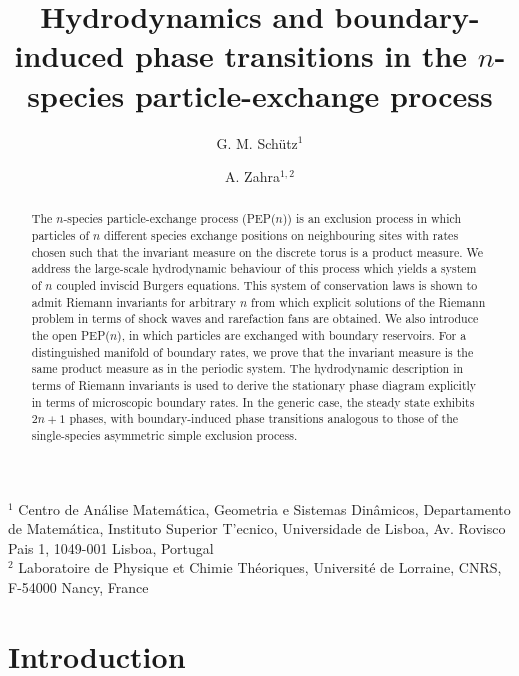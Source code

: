 \documentclass[12pt]{article}
\begin{document}
\title{Hydrodynamics and boundary-induced phase transitions in the $n$-species
particle-exchange process}

   

\author{G. M. Sch\"utz$^{1}$ \and A. Zahra$^{1,2}$}
\vspace{10pt}

\maketitle

\noindent $^{1}$ Centro de An\'alise Matem\'atica, Geometria e Sistemas Din\^amicos, Departamento de Matem\'atica, Instituto Superior T'ecnico, Universidade de Lisboa, Av. Rovisco Pais 1, 1049-001 Lisboa, Portugal\\
$^{2}$ Laboratoire de Physique et Chimie Th\'eoriques, Universit\'e de Lorraine, CNRS, F-54000 Nancy, France\\




\begin{abstract}
The $n$-species particle-exchange process (PEP($n$)) is an exclusion process in which particles of $n$ different species exchange positions on neighbouring sites with rates chosen such that the invariant measure on the discrete torus is a product measure. We address the large-scale hydrodynamic behaviour of this process which yields a
system of $n$ coupled inviscid Burgers 
equations. This system of conservation laws is shown to admit Riemann invariants for arbitrary $n$ from which explicit solutions of the Riemann problem in terms of shock waves and rarefaction fans are obtained. 
We also introduce the open PEP($n$), in which particles are exchanged with boundary reservoirs. For a distinguished manifold of boundary rates, we prove that the invariant measure is the same product measure as in the periodic system. The hydrodynamic description in terms of Riemann invariants is used
to derive the stationary phase diagram explicitly in terms of microscopic boundary rates. In the generic case, the steady state exhibits $2n+1$ phases, with boundary-induced phase transitions analogous to those of the single-species asymmetric simple exclusion process.
\end{abstract}

\section{Introduction}
\end{document}
